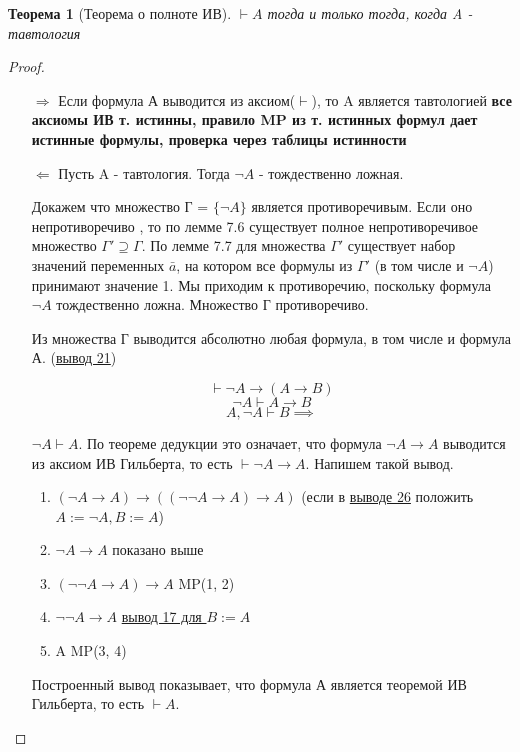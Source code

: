 \documentclass[a4paper]{article}
\newtheorem{theorem}{Теорема}[section]
\theoremstyle{definition}
\theoremstyle{remark}
\begin{document}
	\begin{theorem}[Теорема о полноте ИВ]
		$\vdash A$ тогда и только тогда, когда A - тавтология
	\end{theorem}
	\begin{proof}
        \begin{itemize}
            \item[$\Rightarrow$] Если формула А выводится из аксиом($\vdash$), то A является тавтологией
            \textbf{все аксиомы ИВ т. истинны, правило MP из т. истинных формул дает истинные формулы, проверка через таблицы истинности}
            \item[$\Leftarrow$] Пусть A - тавтология. Тогда $\neg{A}$ - тождественно ложная. 
            
            Докажем что множество Г = $\{\neg{A}\}$ является противоречивым. Если оно непротиворечиво , то по 
            лемме 7.6 существует полное непротиворечивое множество $\Gamma' \supseteq \Gamma$. 
            По лемме 7.7 для множества ${\Gamma}'$ существует набор значений переменных $\bar{a}$, на котором 
            все формулы из $\Gamma'$ (в том числе и $\neg A$) принимают значение 1. Мы приходим к противоречию, 
            поскольку формула $\neg A$ тождественно ложна.
            Множество Г противоречиво. 
            
            Из множества Г выводится абсолютно любая формула, в том числе и формула А. (\hyperlink{Вывод 21}{вывод 21})

            $$\vdash \neg A \to (A \to B)$$
            $$\neg A \vdash A \to B$$
            $$A, \neg A \vdash B\implies$$

            $\neg A \vdash A$. По теореме дедукции это означает, что формула $\neg A \rightarrow A$ выводится из аксиом ИВ Гильберта, то есть $\vdash \neg A \rightarrow A$. Напишем такой вывод.
            \begin{enumerate}
                \item $(\neg A \rightarrow A) \rightarrow ((\neg\neg A \rightarrow A) \rightarrow A)$ (если в \hyperlink{Вывод 26}{выводе 26} положить $A:=\neg A, B :=A$)
                \item $\neg A \rightarrow A$ показано выше
                \item $(\neg\neg A \rightarrow A) \rightarrow A$ MP(1, 2)
                \item $\neg\neg A \rightarrow A$ \hyperlink{Вывод 17}{вывод 17 для $B:= A$}
                \item A MP(3, 4)
            \end{enumerate}
    
            Построенный вывод показывает, что формула А является теоремой ИВ Гильберта, то есть $\vdash A$. 
       
        \end{itemize}
		 \end{proof}
\end{document}
